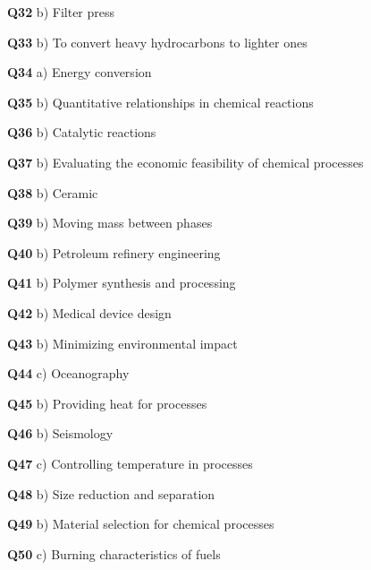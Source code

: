 \textbf{Q32} b) Filter press\par
\textbf{Q33} b) To convert heavy hydrocarbons to lighter ones\par
\textbf{Q34} a) Energy conversion\par
\textbf{Q35} b) Quantitative relationships in chemical reactions\par
\textbf{Q36} b) Catalytic reactions\par
\textbf{Q37} b) Evaluating the economic feasibility of chemical processes\par
\textbf{Q38} b) Ceramic\par
\textbf{Q39} b) Moving mass between phases\par
\textbf{Q40} b) Petroleum refinery engineering\par
\textbf{Q41} b) Polymer synthesis and processing\par
\textbf{Q42} b) Medical device design\par
\textbf{Q43} b) Minimizing environmental impact\par
\textbf{Q44} c) Oceanography\par
\textbf{Q45} b) Providing heat for processes\par
\textbf{Q46} b) Seismology\par
\textbf{Q47} c) Controlling temperature in processes\par
\textbf{Q48} b) Size reduction and separation\par
\textbf{Q49} b) Material selection for chemical processes\par
\textbf{Q50} c) Burning characteristics of fuels\par